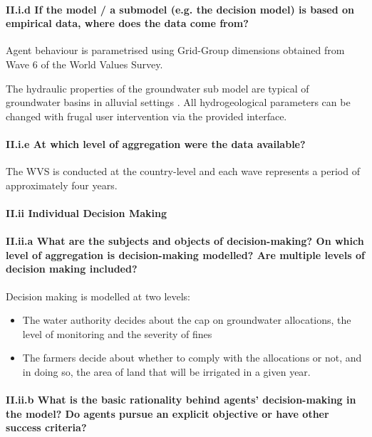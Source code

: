 \documentclass[12pt, a4paper]{article}
\begin{document}
\paragraph{II.i.d If the model / a submodel (e.g. the decision model) is based on empirical data, where does the data come from?}

Agent behaviour is parametrised using Grid-Group dimensions obtained from Wave 6 of the World Values Survey.

The hydraulic properties of the groundwater sub model are typical of groundwater basins in alluvial settings \autocite{Margat:2013ty}. All hydrogeological parameters can be changed with frugal user intervention via the provided interface.

\paragraph{II.i.e At which level of aggregation were the data available?}

The WVS is conducted at the country-level and each wave represents a period of approximately four years.

\paragraph{II.ii Individual Decision Making}

\paragraph{II.ii.a What are the subjects and objects of decision-making? On which level of aggregation is decision-making modelled? Are multiple levels of decision making included?}

Decision making is modelled at two levels:

\begin{itemize} \item The water authority decides about the cap on groundwater allocations, the level of monitoring and the severity of fines \item The farmers decide about whether to comply with the allocations or not, and in doing so, the area of land that will be irrigated in a given year. \end{itemize}

\paragraph{II.ii.b What is the basic rationality behind agents' decision-making in the model? Do agents pursue an explicit objective or have other success criteria?}
\end{document}
